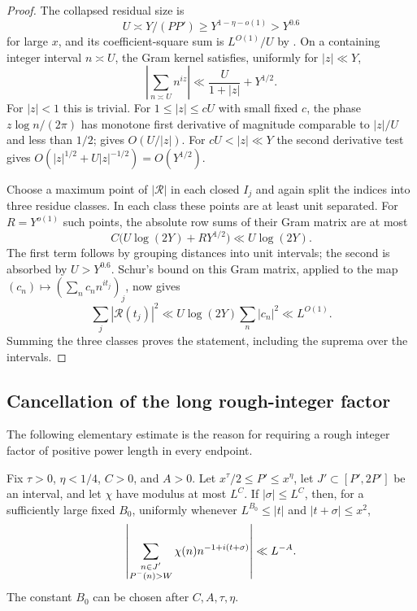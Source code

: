 \begin{proof}
The collapsed residual size is
\[
 U\asymp Y/(PP')\geq Y^{1-\eta-o(1)}>Y^{0.6}
\]
for large $x$, and its coefficient-square sum is $L^{O(1)}/U$ by
. On a containing integer interval
$n\asymp U$, the Gram kernel satisfies, uniformly for $|z|\ll Y$,
\begin{equation}\label{eq:sparse-gram-kernel}
 \left|\sum_{n\asymp U}n^{iz}\right|
             \ll \frac U{1+|z|}+Y^{1/2}.
\end{equation}
For $|z|<1$ this is trivial. For $1\leq|z|\leq cU$ with small
fixed $c$, the phase $z\log n/(2\pi)$ has monotone first derivative
of magnitude comparable to $|z|/U$ and less than $1/2$;
 gives $O(U/|z|)$. For $cU<|z|\ll Y$
the second derivative test gives
$O(|z|^{1/2}+U|z|^{-1/2})=O(Y^{1/2})$.

Choose a maximum point of $|\mathcal R|$ in each closed $I_j$ and
again split the indices into three residue classes. In each class
these points are at least unit separated. For $R=Y^{o(1)}$ such
points, the absolute row sums of their Gram matrix are at most
\[
 C\bigl(U\log(2Y)+RY^{1/2}\bigr)\ll U\log(2Y).
\]
The first term follows by grouping distances into unit intervals;
the second is absorbed by $U>Y^{0.6}$. Schur's bound on this Gram
matrix, applied to the map
$(c_n)\mapsto(\sum_nc_nn^{it_j})_j$, now gives
\[
 \sum_j|\mathcal R(t_j)|^2
       \ll U\log(2Y)\sum_n|c_n|^2\ll L^{O(1)}.
\]
Summing the three classes proves the statement, including the
suprema over the intervals.
\end{proof}

\subsection{Cancellation of the long rough-integer factor}

The following elementary estimate is the reason for requiring a
rough integer factor of positive power length in every endpoint.

\begin{lemma}\label{lem:long-rough-polynomial}
Fix $\tau>0$, $\eta<1/4$, $C>0$, and $A>0$. Let
$x^\tau/2\leq P'\leq x^\eta$, let $J'\subset[P',2P']$ be an interval,
and let $\chi$ have modulus at most $L^C$. If $|\sigma|\leq L^C$,
then, for a sufficiently large fixed $B_0$, uniformly whenever
$L^{B_0}\leq|t|$ and $|t+\sigma|\leq x^2$,
\[
 \left|\sum_{\substack{n\in J'\\P^{-}(n)>W}}
                \chi(n)n^{-1+i(t+\sigma)}\right|\ll L^{-A}.
\]
The constant $B_0$ can be chosen after $C,A,\tau,\eta$.
\end{lemma}

